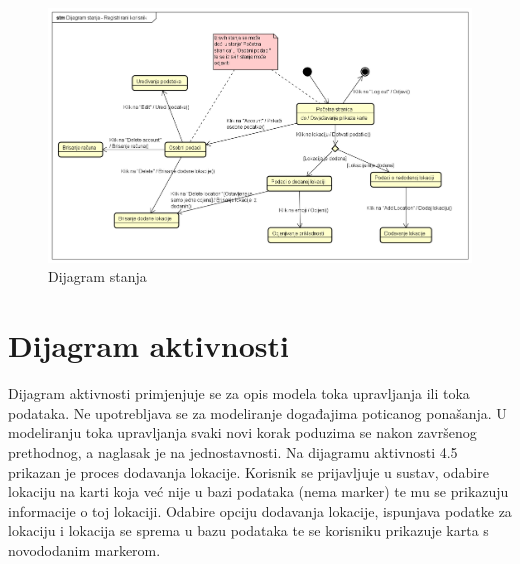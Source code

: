 			\begin{figure}[H]
			\includegraphics[scale=0.4]{slike/DijagramStanja.png}
			\centering
			\caption{Dijagram stanja}
			\label{fig:promjene}
				\end{figure}

         \section{Dijagram aktivnosti}
         
		 Dijagram aktivnosti primjenjuje se za opis modela toka upravljanja ili toka podataka. Ne upotrebljava se za modeliranje događajima poticanog ponašanja. U modeliranju toka upravljanja svaki novi korak poduzima se nakon završenog prethodnog, a naglasak je na jednostavnosti. Na dijagramu aktivnosti 4.5 prikazan je proces dodavanja lokacije. Korisnik se prijavljuje u sustav, odabire lokaciju na karti koja već nije u bazi podataka (nema marker)  te mu se prikazuju informacije o toj lokaciji.  Odabire opciju dodavanja lokacije, ispunjava podatke za lokaciju i lokacija se sprema u bazu podataka te se korisniku prikazuje karta s novododanim markerom. 
         

